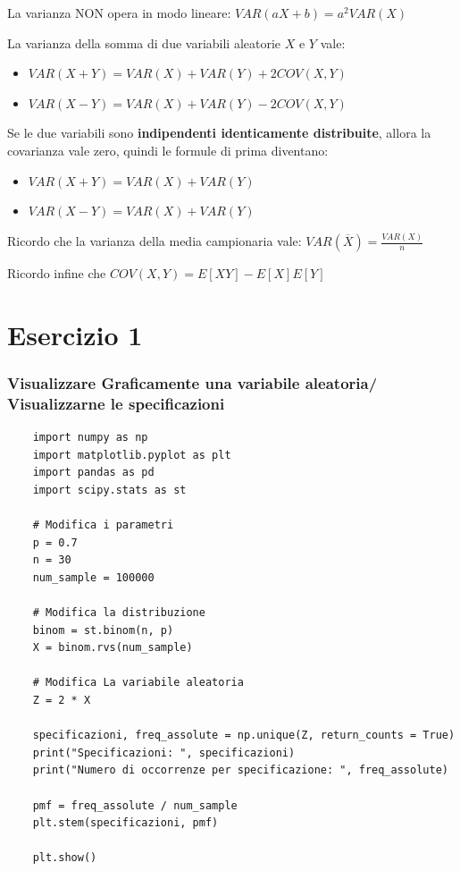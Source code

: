 \documentclass{article}
\begin{document}
La varianza NON opera in modo lineare: $VAR(aX + b) = a^2 VAR(X)$

La varianza della somma di due variabili aleatorie $X$ e $Y$ vale:

\begin{itemize}
    \item $VAR(X + Y) = VAR(X) + VAR(Y) + 2COV(X,Y)$
    \item $VAR(X - Y) = VAR(X) + VAR(Y) - 2COV(X,Y)$
\end{itemize}

Se le due variabili sono \textbf{indipendenti identicamente distribuite}, allora la covarianza vale zero, quindi le formule di prima diventano:

\begin{itemize}
    \item $VAR(X + Y) = VAR(X) + VAR(Y)$
    \item $VAR(X - Y) = VAR(X) + VAR(Y)$
\end{itemize}

Ricordo che la varianza della media campionaria vale: $VAR(\overline{X}) = \frac{VAR(X)}{n}$

Ricordo infine che $COV(X, Y) = E[XY] - E[X]E[Y]$

\pagebreak

\section{Esercizio 1}

\subsubsection*{Visualizzare Graficamente una variabile aleatoria/ Visualizzarne le specificazioni}

\begin{lstlisting}
    import numpy as np
    import matplotlib.pyplot as plt
    import pandas as pd
    import scipy.stats as st

    # Modifica i parametri
    p = 0.7
    n = 30
    num_sample = 100000

    # Modifica la distribuzione
    binom = st.binom(n, p)
    X = binom.rvs(num_sample)

    # Modifica La variabile aleatoria
    Z = 2 * X

    specificazioni, freq_assolute = np.unique(Z, return_counts = True)
    print("Specificazioni: ", specificazioni)
    print("Numero di occorrenze per specificazione: ", freq_assolute)

    pmf = freq_assolute / num_sample
    plt.stem(specificazioni, pmf)

    plt.show()
\end{lstlisting}
\end{document}
